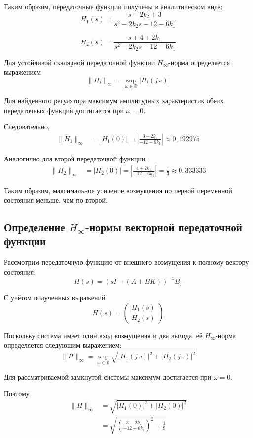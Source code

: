 Таким образом, передаточные функции
получены в аналитическом виде:
\[
H_1(s)=
\frac{s-2k_2+3}
{s^2-2k_2s-12-6k_1}
\]

\[
H_2(s)=
\frac{s+4+2k_1}
{s^2-2k_2s-12-6k_1}
\]

Для устойчивой скалярной передаточной функции
$H_\infty$-норма определяется выражением
\[
\|H_i\|_\infty=
\sup_{\omega\in\mathbb R}|H_i(j\omega)|
\]

Для найденного регулятора максимум амплитудных
характеристик обеих передаточных функций
достигается при $\omega=0$.

Следовательно,
\[
\begin{aligned}
\|H_1\|_\infty
&=|H_1(0)|=\left|
\frac{3-2k_2}{-12-6k_1}
\right|
\approx0{,}192975
\end{aligned}
\]

Аналогично для второй передаточной функции:
\[
\begin{aligned}
\|H_2\|_\infty
&=|H_2(0)|=\left|
\frac{4+2k_1}{-12-6k_1}
\right|=\frac13
\approx0{,}333333
\end{aligned}
\]


Таким образом, максимальное усиление возмущения
по первой переменной состояния меньше, чем по второй.

\subsection{Определение $H_\infty$-нормы векторной передаточной функции}

Рассмотрим передаточную функцию от внешнего
возмущения к полному вектору состояния:
\[
H(s)=(sI-(A+BK))^{-1}B_f
\]

С учётом полученных выражений
\[
H(s)=
\begin{pmatrix}
H_1(s)\\
H_2(s)
\end{pmatrix}
\]

Поскольку система имеет один вход возмущения
и два выхода, её $H_\infty$-норма определяется
следующим выражением:
\[
\|H\|_\infty=
\sup_{\omega\in\mathbb R}
\sqrt{
|H_1(j\omega)|^2+
|H_2(j\omega)|^2
}
\]

Для рассматриваемой замкнутой системы максимум
достигается при $\omega=0$.

Поэтому
\[
\begin{aligned}
\|H\|_\infty
&=\sqrt{|H_1(0)|^2+|H_2(0)|^2}\\
&=\sqrt{
\left(\frac{3-2k_2}{-12-6k_1}\right)^2
+\frac19
}
\end{aligned}
\]

